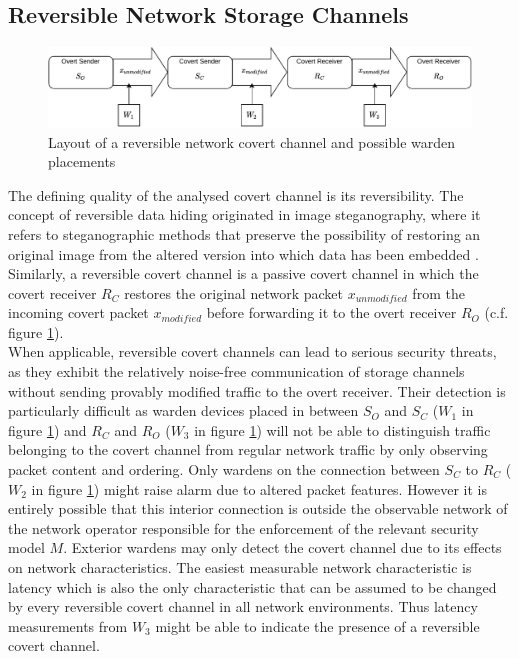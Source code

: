 \documentclass[12pt,a4paper,automark, toc=bib]{scrreprt}
\theoremstyle{definition}
\begin{document}
			\subsection{Reversible Network Storage Channels}
			\begin{figure}	
				\includegraphics[width=\linewidth]{"figures/reversible_cc.pdf"}
				\caption{Layout of a reversible network covert channel and possible warden placements}
				\label{revcov}
			\end{figure}
			The defining quality of the analysed covert channel is its reversibility. The concept of reversible data hiding originated in image steganography, where it refers to steganographic methods that preserve the possibility of restoring an original image from the altered version into which data has been embedded  \cite{Celik2006}. Similarly, a reversible covert channel is a passive covert channel in which the covert receiver $R_C$ restores the original network packet $x_{unmodified}$ from the incoming covert packet $x_{modified}$ before forwarding it to the overt receiver $R_O$  \cite{Wendzel2015} (c.f. figure \ref{revcov}). \\
			When applicable, reversible covert channels can lead to serious security threats, as they exhibit the relatively noise-free communication of storage channels without sending provably modified traffic to the overt receiver. Their detection is particularly difficult as warden devices placed in between $S_O$ and $S_C$ ($W_1$ in figure \ref{revcov}) and $R_C$ and $R_O$ ($W_3$ in figure \ref{revcov}) will not be able to distinguish traffic belonging to the covert channel from regular network traffic by only observing packet content and ordering. Only wardens on the connection between $S_C$ to $R_C$ ($W_2$ in figure \ref{revcov}) might raise alarm due to altered packet features. However it is entirely possible that this interior connection is outside the observable network of the network operator responsible for the enforcement of the relevant security model $M$. Exterior wardens may only detect the covert channel due to its effects on network characteristics. The easiest measurable network characteristic is latency which is also the only characteristic that can be assumed to be changed by every reversible covert channel in all network environments. Thus latency measurements from $W_3$ might be able to indicate the presence of a reversible covert channel. 
			
\end{document}
